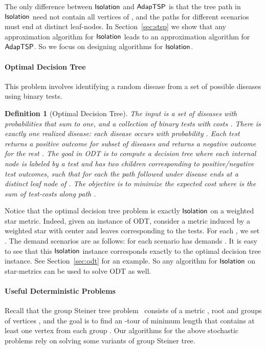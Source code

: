 \documentclass[11pt]{article}
\newtheorem{definition}{Definition}
\def\odt{{\sf ODT}\xspace}
\def\isoprob{\ensuremath{{\sf Isolation}}\xspace}
\def\stsp{\ensuremath{{\sf AdapTSP}}\xspace}
\begin{document}
The only difference between \isoprob and \stsp is that the tree path  in \isoprob need not contain
all vertices of , and the paths for different scenarios must  end at distinct leaf-nodes. In Section~\ref{sec:stsp} we show that  any approximation algorithm for \isoprob leads to an approximation algorithm for \stsp. So we focus on designing algorithms for \isoprob. 




\paragraph{Optimal Decision Tree} This problem involves identifying a random disease from a set of possible diseases using binary tests.  

\smallskip
\begin{definition}[Optimal Decision Tree]\label{def:odt}
The input is a set of  diseases with 
probabilities  that sum to one, and a collection  of  binary tests with
 costs . There is exactly one realized disease: each disease  occurs with probability . Each test  returns a positive outcome for subset  of  diseases and returns a negative outcome for the rest . The goal in \odt is to compute a decision tree  where each internal node is  labeled by a test and has two children corresponding to  positive/negative test outcomes, such that for each  the path  followed under disease  ends at a distinct leaf node of . The objective is to minimize the expected cost  where  is the sum of test-costs along path .
\end{definition}
\smallskip

Notice that the optimal decision tree problem is exactly \isoprob on a weighted star metric. Indeed, given an instance of \odt, consider a metric  induced by a weighted star with  center  and  leaves corresponding to the tests. For each , we set . The demand scenarios are as
  follows: for each  scenario  has demands .
  It is easy to see that this \isoprob instance corresponds
  exactly to the optimal decision tree instance. See  Section~\ref{sec:odt} for an example. So any algorithm for  \isoprob on star-metrics can be used to solve \odt as well. 





\paragraph{Useful Deterministic Problems} Recall that the group Steiner tree problem~\cite{gkr,hk03} consists of a metric , root  and  groups of 
vertices , and the goal is to find an -tour of minimum length that contains at least one vertex from each group .  Our algorithms for the above stochastic problems rely on solving some variants of group Steiner tree. 
\end{document}
